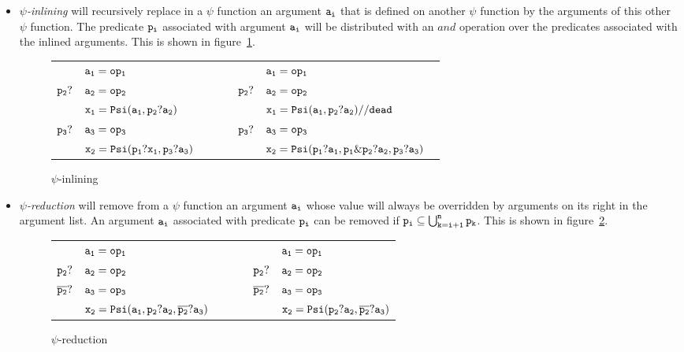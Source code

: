 \begin{itemize}

\item{\emph{$\psi$-inlining}} will recursively replace in a $\psi$
  function an argument ${\tt a_i}$ that is defined on another $\psi$
  function by the arguments of this other $\psi$ function. The
  predicate ${\tt p_i}$ associated with argument ${\tt a_i}$ will be distributed
  with an $and$ operation over the predicates associated with the
  inlined arguments. This is shown in figure~\ref{fig:psi_inlining}.

\begin{figure}
\begin{center}
\footnotesize
\begin{tabular}{lllll}
             & ${\tt a_1 = op_1}$             & \ \ \ \  &             & ${\tt a_1 = op_1}$ \\
${\tt p_2?}$ & ${\tt a_2 = op_2}$             & \ \ \ \  & ${\tt p_2?}$ & ${\tt a_2 = op_2}$ \\
             & ${\tt x_1 = Psi(a_1, p_2?a_2)}$ & \ \ \ \  &             & ${\tt x_1 = Psi(a_1, p_2?a_2) // dead}$ \\
${\tt p_3?}$ & ${\tt a_3 = op_3}$              & \ \ \ \  & ${\tt p_3?}$ & ${\tt a_3 = op_3}$ \\
             & ${\tt x_2 = Psi(p_1?x_1, p_3?a_3)}$ & \ \ \ \  &           &${\tt x_2 = Psi(p_1?a_1, p_1\&p_2?a_2, p_3?a_3)}$ \
\end{tabular}
\caption{$\psi$-inlining}
\label{fig:psi_inlining}
\end{center}
\end{figure}


\item{\emph{$\psi$-reduction}} will remove from a $\psi$ function an
  argument ${\tt a_i}$ whose value will always be overridden by arguments on
  its right in the argument list. An argument ${\tt a_i}$ associated
  with predicate ${\tt p_i}$ can be removed if ${\tt p_i \subseteq
    \bigcup_{k=i+1}^n p_k}$. This is shown in
  figure~\ref{fig:psi_reduction}.

\begin{figure}
\begin{center}
\footnotesize
\begin{tabular}{lllll}
             & ${\tt a_1 = op_1}$             & \ \ \ \  &             & ${\tt a_1 = op_1}$ \\
${\tt p_2?}$ & ${\tt a_2 = op_2}$             & \ \ \ \  & ${\tt p_2?}$ & ${\tt a_2 = op_2}$ \\
${\tt \overline{p_2}?}$ & ${\tt a_3 = op_3}$              & \ \ \ \  & ${\tt \overline{p_2}?}$ & ${\tt a_3 = op_3}$ \\
             & ${\tt x_2 = Psi(a_1, p_2?a_2, \overline{p_2}?a_3)}$ & \ \ \ \  &              &${\tt x_2 = Psi(p_2?a_2, \overline{p_2}?a_3)}$ \\
\end{tabular}
\caption{$\psi$-reduction}
\label{fig:psi_reduction}
\end{center}
\end{figure}


\end{itemize}
